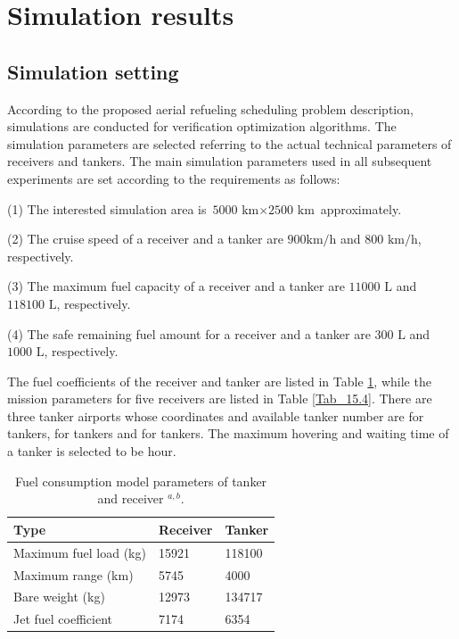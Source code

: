 \section{Simulation results}\label{sec_5}
\subsection{Simulation setting}\label{sec_5.1}

According to the proposed aerial refueling scheduling problem description, simulations are conducted for verification optimization algorithms. The simulation parameters are selected referring to the actual technical parameters of receivers and tankers. The main simulation parameters used in all subsequent experiments are set according to the requirements as follows:

(1) The interested simulation area is $\text{5000 km}\times \text{2500 km}$ approximately.

(2) The cruise speed of a receiver and a tanker are $ \text{900km/h}$ and $\text{800 km/h}$, respectively.

(3) The maximum fuel capacity of a receiver and a tanker are $ \text{11000 L}$ and $ \text{118100 L}$, respectively.

(4) The safe remaining fuel amount for a receiver and a tanker are $ \text{300 L}$ and $ \text{1000 L}$, respectively.

The fuel coefficients of the receiver and tanker are listed in Table \ref{Tab_15.3}, while the mission parameters for five receivers are listed in Table \ref{Tab_15.4}. There are three tanker airports whose coordinates and available tanker number are  for  tankers,  for  tankers and  for  tankers. The maximum hovering and waiting time of a tanker is selected to be  hour.


\begin{table}
	\caption{Fuel consumption model parameters of tanker and receiver $^{a,b}$.}
	\begin{centering}
		\begin{tabular}{l|l|l}
			\hline 
			Type & Receiver & Tanker\tabularnewline
			\hline 
			Maximum fuel load (kg)&15921&118100\tabularnewline
			Maximum range (km)&5745&4000\tabularnewline
			Bare weight (kg)&12973&134717\tabularnewline
			Jet fuel coefficient&7174&6354\tabularnewline                                    
			\hline 
		\end{tabular}
		\par\end{centering}
	\centering{}
	\label{Tab_15.3}
\end{table}


